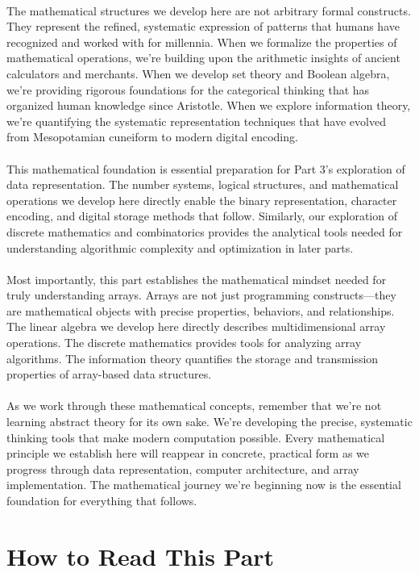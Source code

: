 \documentclass[12pt, oneside, openany]{book}
\begin{document}
\\
The mathematical structures we develop here are not arbitrary formal constructs. They represent the refined, systematic expression of patterns that humans have recognized and worked with for millennia. When we formalize the properties of mathematical operations, we're building upon the arithmetic insights of ancient calculators and merchants. When we develop set theory and Boolean algebra, we're providing rigorous foundations for the categorical thinking that has organized human knowledge since Aristotle. When we explore information theory, we're quantifying the systematic representation techniques that have evolved from Mesopotamian cuneiform to modern digital encoding.\\
\\
This mathematical foundation is essential preparation for Part 3's exploration of data representation. The number systems, logical structures, and mathematical operations we develop here directly enable the binary representation, character encoding, and digital storage methods that follow. Similarly, our exploration of discrete mathematics and combinatorics provides the analytical tools needed for understanding algorithmic complexity and optimization in later parts.\\
\\
Most importantly, this part establishes the mathematical mindset needed for truly understanding arrays. Arrays are not just programming constructs—they are mathematical objects with precise properties, behaviors, and relationships. The linear algebra we develop here directly describes multidimensional array operations. The discrete mathematics provides tools for analyzing array algorithms. The information theory quantifies the storage and transmission properties of array-based data structures.\\
\\
As we work through these mathematical concepts, remember that we're not learning abstract theory for its own sake. We're developing the precise, systematic thinking tools that make modern computation possible. Every mathematical principle we establish here will reappear in concrete, practical form as we progress through data representation, computer architecture, and array implementation. The mathematical journey we're beginning now is the essential foundation for everything that follows.

\newpage
\section*{How to Read This Part}
\end{document}
